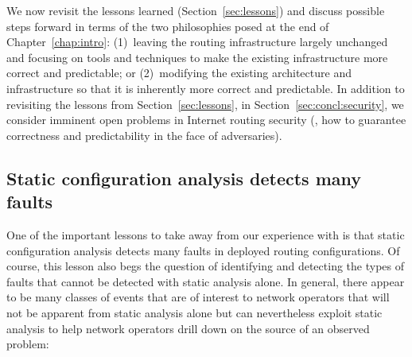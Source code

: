 We now revisit the lessons learned (Section~\ref{sec:lessons}) and
discuss possible steps forward in terms of the two philosophies posed at
the end of Chapter~\ref{chap:intro}: (1)~leaving the routing infrastructure
largely unchanged and focusing on tools and techniques to make the
existing infrastructure more correct and predictable; or (2)~modifying
the existing architecture and infrastructure so that it is inherently
more correct and predictable.  In addition to revisiting the lessons
from Section~\ref{sec:lessons}, in 
Section~\ref{sec:concl:security}, we consider imminent open problems in
Internet 
routing security (\ie, how to guarantee correctness and predictability
in the face of adversaries).

\subsection{Static configuration analysis detects many faults}

One of the important lessons to take away from our experience with \rcc
is that static configuration
analysis detects many faults in deployed routing configurations.  
Of course, this lesson also begs the question of identifying and
detecting the types of faults that
cannot be detected with static analysis alone.  In general, there appear to be many
classes of events that are of interest to network operators that will
not be apparent from static analysis alone but can nevertheless exploit 
static analysis to help network operators drill down on the source of an
observed problem:

